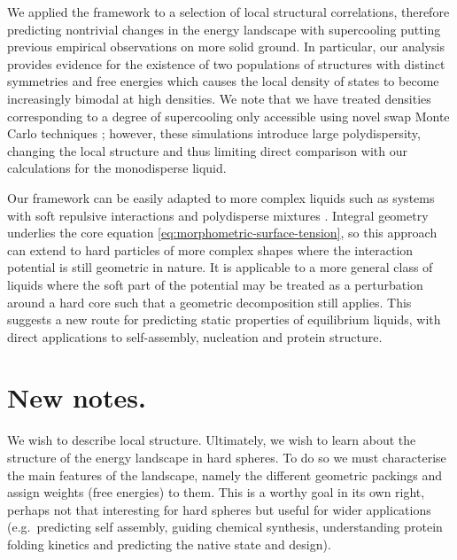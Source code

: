 \documentclass[11pt,twoside]{report}
\begin{document}
We applied the framework to a selection of local structural correlations, therefore predicting nontrivial changes in the energy landscape with supercooling putting previous empirical observations on more solid ground.
In particular, our analysis provides evidence for the existence of two populations of structures with distinct symmetries and free energies which causes the local density of states to become increasingly bimodal at high densities.
We note that we have treated densities corresponding to a degree of supercooling only accessible using novel swap Monte Carlo techniques \cite{BerthierPRL2016}; however, these simulations introduce large polydispersity, changing the local structure \cite{CoslovichJPCM2018} and thus limiting direct comparison with our calculations for the monodisperse liquid.

Our framework can be easily adapted to more complex liquids such as systems with soft repulsive interactions and polydisperse mixtures \cite{KodamaJCP2011}.
Integral geometry underlies the core equation \eqref{eq:morphometric-surface-tension}, so this approach can extend to hard particles of more complex shapes where the interaction potential is still geometric in nature.
It is applicable to a more general class of liquids where the soft part of the potential may be treated as a perturbation around a hard core \cite{Hansen2013} such that a geometric decomposition still applies.
This suggests a new route for predicting static properties of equilibrium liquids, with direct applications to self-assembly, nucleation and protein structure.

\section{New notes.}

We wish to describe local structure.
Ultimately, we wish to learn about the structure of the energy landscape in hard spheres.
To do so we must characterise the main features of the landscape, namely the different geometric packings and assign weights (free energies) to them.
This is a worthy goal in its own right, perhaps not that interesting for hard spheres but useful for wider applications (e.g.\ predicting self assembly, guiding chemical synthesis, understanding protein folding kinetics and predicting the native state and design).
\end{document}
